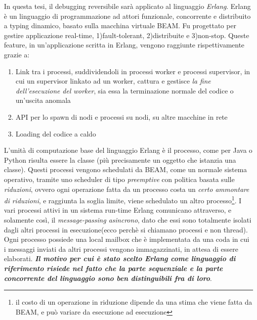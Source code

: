 \documentclass[Tesi.tex]{subfiles}
\begin{document}
In questa tesi, il debugging reversibile sarà applicato al linguaggio \textit{Erlang}\cite{erlangDoc}.
Erlang è un linguaggio di programmazione ad attori funzionale, concorrente e distribuito a typing dinamico, basato sulla macchina virtuale BEAM.
Fu progettato per gestire applicazione real-time, 1)fault-tolerant, 2)distribuite e 3)non-stop.
Queste feature, in un'applicazione scritta in Erlang, vengono raggiunte rispettivamente grazie a:
\begin{enumerate}
	\item{Link tra i processi, suddividendoli in processi worker e processi supervisor, in cui un supervisor linkato ad un worker, cattura e gestisce \textit{la fine dell'esecuzione del worker}, sia essa la terminazione normale del codice o un'uscita anomala}
	\item{API per lo spawn di nodi e processi su nodi, su altre macchine in rete}
	\item{Loading del codice a caldo}
\end{enumerate}
L'unità di computazione base del linguaggio Erlang è il processo, come per Java o Python risulta essere 
la classe (più precisamente un oggetto che istanzia una classe).
Questi processi vengono schedulati da BEAM, come un normale sistema operativo, tramite uno scheduler di tipo \textit{preemptive} con politica basata sulle \textit{riduzioni}, ovvero ogni operazione fatta da un processo costa un \textit{certo ammontare di riduzioni}, e raggiunta la soglia limite, viene schedulato un altro processo\footnote{il costo di un operazione in riduzione dipende da una stima che viene fatta da BEAM, e può variare da esecuzione ad esecuzione}.
I vari processi attivi in un sistema run-time Erlang comunicano attraverso, e solamente così, il \textit{message-passing asincrono}, dato che essi sono totalmente isolati dagli altri processi in esecuzione(ecco perchè si chiamano processi e non thread).
Ogni processo possiede una local mailbox che è implementata da una coda in cui i messaggi inviati da altri processi vengono immagazzinati, in attesa di essere elaborati.
\textbf{\textit{Il motivo per cui è stato scelto Erlang come linguaggio di riferimento risiede nel fatto che la parte sequenziale e la parte concorrente del linguaggio sono ben distinguibili fra di loro}}.
\end{document}
